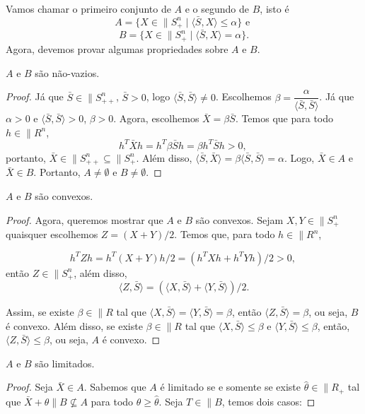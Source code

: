 \begin{homeworkProblemAnswer}
Vamos chamar o primeiro conjunto de $A$ e o segundo de $B$, isto é
$$A = \{X \in \|{S}_{+}^{n} \mid \langle \bar{S}, X \rangle \leq \alpha \} \text{ e } $$
$$B = \{X \in \|{S}_{+}^{n} \mid \langle \bar{S}, X \rangle = \alpha \} \text{.} $$
Agora, devemos provar algumas propriedades sobre $A$ e $B$.
\begin{prop}
$A$ e $B$ são não-vazios.
\end{prop}
\begin{proof}
Já que $\bar{S} \in \|{S}_{++}^n$, $\bar{S} > 0$, logo $\langle \bar{S}, \bar{S} \rangle \neq 0$. Escolhemos $\beta = \dfrac{\alpha}{\langle \bar{S}, \bar{S} \rangle}$. Já que $\alpha > 0$ e $\langle \bar{S}, \bar{S} \rangle > 0$, $\beta > 0$. Agora, escolhemos $\bar{X} = \beta\bar{S}$. Temos que para todo $h \in \|{R}^n$,  
$$ h^T\bar{X}h = h^T\beta\bar{S}h = \beta h^T\bar{S}h > 0 \text{, } $$
portanto, $\bar{X} \in \|{S}_{++}^n \subseteq \|{S}_{+}^n$. Além disso, $\langle \bar{S}, \bar{X} \rangle = \beta \langle \bar{S}, \bar{S} \rangle = \alpha$. Logo, $\bar{X} \in A$ e $\bar{X} \in B$. Portanto, $A \neq \emptyset$ e $B \neq \emptyset$.
\end{proof}

\begin{prop}
$A$ e $B$ são convexos.
\end{prop}
\begin{proof}
Agora, queremos mostrar que $A$ e $B$ são convexos. Sejam $X,Y \in \|{S}_{+}^n$ quaisquer escolhemos $Z = (X+Y)/2$. Temos que, para todo $h \in \|{R}^n$,

$$h^TZh = h^T(X+Y)h/2 = (h^TXh + h^TYh)/2 > 0 \text{, }$$
então $Z \in \|{S}_{+}^n$, além disso,
$$\langle Z, \bar{S} \rangle = (\langle X, \bar{S} \rangle + \langle Y, \bar{S} \rangle)/2 \text{.}$$

Assim, se existe $\beta \in \|{R}$ tal que $\langle X, \bar{S} \rangle = \langle Y, \bar{S} \rangle = \beta$, então $\langle Z, \bar{S} \rangle = \beta$, ou seja, $B$ é convexo. Além disso, se existe $\beta \in \|{R}$ tal que $\langle X, \bar{S} \rangle \leq \beta$ e $\langle Y, \bar{S} \rangle \leq \beta$, então, $\langle Z, \bar{S} \rangle \leq \beta$, ou seja, $A$ é convexo.
\end{proof}

\begin{prop}
$A$ e $B$ são limitados.
\end{prop}
\begin{proof}
Seja $\bar{X} \in A$. Sabemos que $A$ é limitado se e somente se existe $\hat{\theta} \in \|{R}_+$ tal que $\bar{X} + \theta \|{B} \not\subseteq A$ para todo $\theta \geq \hat{\theta}$. Seja $T \in \|{B}$, temos dois casos:  


\end{proof}
\end{homeworkProblemAnswer}
